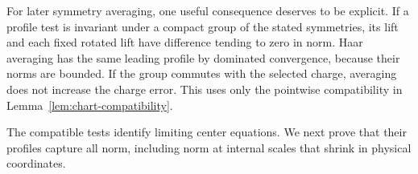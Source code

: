 For later symmetry averaging, one useful consequence deserves
to be explicit. If a profile test is invariant under a compact
group of the stated symmetries, its lift and each fixed rotated
lift have difference tending to zero in norm. Haar averaging
has the same leading profile by dominated convergence, because
their norms are bounded. If the group commutes with the selected
charge, averaging does not increase the charge error. This uses
only the pointwise compatibility in Lemma~\ref{lem:chart-compatibility}.

The compatible tests identify limiting center equations. We next prove
that their profiles capture all norm, including norm at internal scales
that shrink in physical coordinates.
